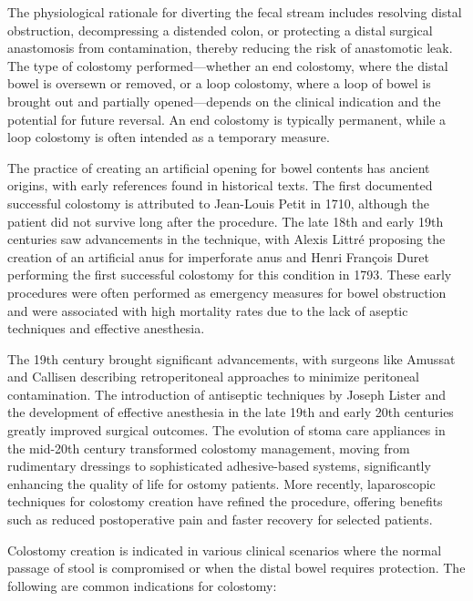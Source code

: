 The physiological rationale for diverting the fecal stream includes resolving distal obstruction, decompressing a distended colon, or protecting a distal surgical anastomosis from contamination, thereby reducing the risk of anastomotic leak. The type of colostomy performed—whether an end colostomy, where the distal bowel is oversewn or removed, or a loop colostomy, where a loop of bowel is brought out and partially opened—depends on the clinical indication and the potential for future reversal. An end colostomy is typically permanent, while a loop colostomy is often intended as a temporary measure.

The practice of creating an artificial opening for bowel contents has ancient origins, with early references found in historical texts. The first documented successful colostomy is attributed to Jean-Louis Petit in 1710, although the patient did not survive long after the procedure. The late 18th and early 19th centuries saw advancements in the technique, with Alexis Littr\'{e} proposing the creation of an artificial anus for imperforate anus and Henri Fran\c{c}ois Duret performing the first successful colostomy for this condition in 1793. These early procedures were often performed as emergency measures for bowel obstruction and were associated with high mortality rates due to the lack of aseptic techniques and effective anesthesia.

The 19th century brought significant advancements, with surgeons like Amussat and Callisen describing retroperitoneal approaches to minimize peritoneal contamination. The introduction of antiseptic techniques by Joseph Lister and the development of effective anesthesia in the late 19th and early 20th centuries greatly improved surgical outcomes. The evolution of stoma care appliances in the mid-20th century transformed colostomy management, moving from rudimentary dressings to sophisticated adhesive-based systems, significantly enhancing the quality of life for ostomy patients. More recently, laparoscopic techniques for colostomy creation have refined the procedure, offering benefits such as reduced postoperative pain and faster recovery for selected patients.

Colostomy creation is indicated in various clinical scenarios where the normal passage of stool is compromised or when the distal bowel requires protection. The following are common indications for colostomy:


